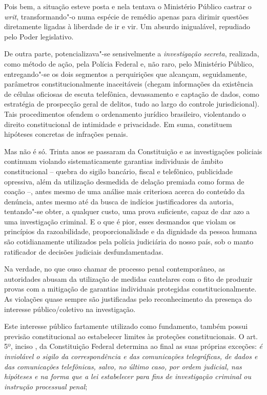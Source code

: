 Pois bem, a situação esteve posta e nela tentava o Ministério Público
castrar o \emph{writ}, transformando"-o numa espécie de remédio apenas
para dirimir questões diretamente ligadas à liberdade de ir e vir. Um
absurdo inigualável, repudiado pelo Poder legislativo.

De outra parte, potencializava"-se sensivelmente a \emph{investigação
secreta}, realizada, como método de ação, pela Polícia Federal e, não
raro, pelo Ministério Público, entregando"-se os dois segmentos a
perquirições que alcançam, seguidamente, parâmetros constitucionalmente
inaceitáveis (chegam informações da existência de células oficiosas de
escuta telefônica, devassamento e captação de dados, como estratégia de
prospecção geral de delitos, tudo ao largo do controle jurisdicional).
Tais procedimentos ofendem o ordenamento jurídico brasileiro,
violentando o direito constitucional de intimidade e privacidade. Em
suma, constituem hipóteses concretas de infrações penais.

Mas não é só. Trinta anos se passaram da Constituição e as investigações
policiais continuam violando sistematicamente garantias individuais de
âmbito constitucional -- quebra do sigilo bancário, fiscal e telefônico,
publicidade opressiva, além da utilização desmedida de delação premiada
como forma de coação --, antes mesmo de uma análise mais criteriosa
acerca do conteúdo da denúncia, antes mesmo até da busca de indícios
justificadores da autoria, tentando"-se obter, a qualquer custo, uma
prova suficiente, capaz de dar azo a uma investigação criminal. E o que
é pior, esses desmandos que violam os princípios da razoabilidade,
proporcionalidade e da dignidade da pessoa humana são cotidianamente
utilizados pela polícia judiciária do nosso país, sob o manto
ratificador de decisões judiciais desfundamentadas.

Na verdade, no que ouso chamar de processo penal contemporâneo, as
autoridades abusam da utilização de medidas cautelares com o fito de
produzir provas com a mitigação de garantias individuais protegidas
constitucionalmente. As violações quase sempre são justificadas pelo
reconhecimento da presença do interesse público/coletivo na
investigação.

Este interesse público fartamente utilizado como fundamento, também
possui previsão constitucional ao estabelecer limites às proteções
constitucionais. O art. 5º, inciso , da Constituição Federal
determina ao final as suas próprias exceções: \emph{é inviolável o
sigilo da correspondência e das comunicações telegráficas, de dados e
das comunicações telefônicas, salvo, no último caso, por ordem judicial,
nas hipóteses e na forma que a lei estabelecer para fins de investigação
criminal ou instrução processual penal};\emph{~~}

